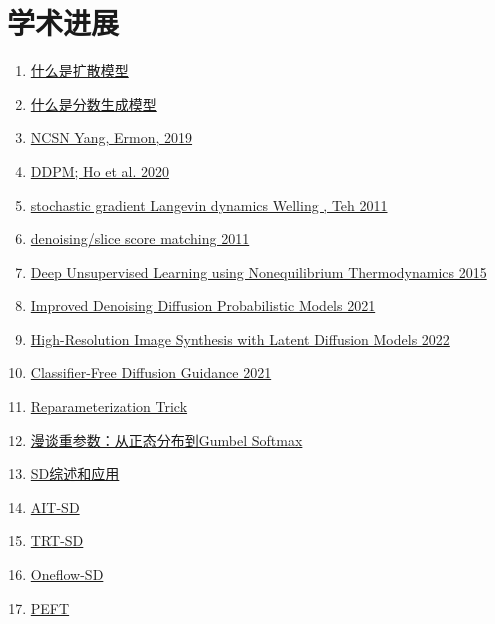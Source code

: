 \documentclass[lang=cn,newtx,10pt,scheme=chinese]{elegantbook}
\begin{document}
\section{学术进展}
\begin{enumerate}
  \item \href{https://lilianweng.github.io/posts/2021-07-11-diffusion-models/}{什么是扩散模型}
  \item \href{http://yang-song.net/blog/2021/score/}{什么是分数生成模型}
  \item \href{https://arxiv.org/abs/1907.05600}{NCSN Yang, Ermon, 2019}
  \item \href{https://arxiv.org/abs/2006.11239}{DDPM; Ho et al. 2020}
  \item \href{https://www.stats.ox.ac.uk/~teh/research/compstats/WelTeh2011a.pdf}{stochastic gradient Langevin dynamics Welling , Teh 2011}
  \item \href{http://www.iro.umontreal.ca/~vincentp/Publications/smdae_techreport.pdf}{denoising/slice score matching 2011}
  \item \href{https://arxiv.org/abs/1503.03585}{Deep Unsupervised Learning using Nonequilibrium Thermodynamics 2015}
  \item \href{https://arxiv.org/abs/2102.09672}{Improved Denoising Diffusion Probabilistic Models 2021}
  \item \href{https://arxiv.org/abs/2112.10752}{High-Resolution Image Synthesis with Latent Diffusion Models 2022}
  \item \href{https://openreview.net/forum?id=qw8AKxfYbI}{Classifier-Free Diffusion Guidance 2021}
  \item \href{https://sassafras13.github.io/ReparamTrick/}{Reparameterization Trick}
  \item \href{https://kexue.fm/archives/6705}{漫谈重参数：从正态分布到Gumbel Softmax}
  \item \href{https://github.com/YangLing0818/Diffusion-Models-Papers-Survey-Taxonomy}{SD综述和应用}
  \item \href{https://github.com/facebookincubator/AITemplate/tree/main/examples/05_stable_diffusion}{AIT-SD}
  \item \href{https://github.com/NVIDIA/TensorRT/tree/release/8.6/demo/Diffusion}{TRT-SD}
  \item \href{https://github.com/Oneflow-Inc/diffusers}{Oneflow-SD}
  \item \href{https://github.com/huggingface/peft}{PEFT}
\end{enumerate}
\end{document}
